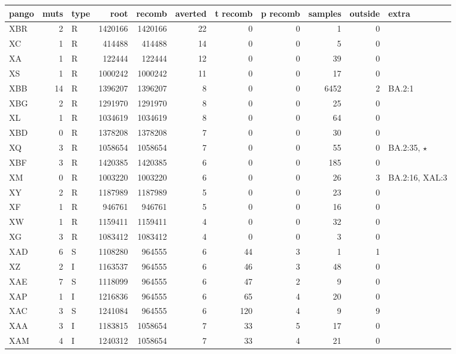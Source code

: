 \documentclass[a4paper]{article}
\begin{document}
\begin{footnotesize}
\begin{center}

\begin{tabular}{lrlrrrrrrrl}
\toprule
pango & muts & type & root & recomb & averted & t recomb & p recomb & samples &
outside & extra \\
\midrule
XBR & 2 & R & 1420166 & 1420166 & 22 & 0 & 0 & 1 & 0 & {} \\
XC & 1 & R & 414488 & 414488 & 14 & 0 & 0 & 5 & 0 & {} \\
XA & 1 & R & 122444 & 122444 & 12 & 0 & 0 & 39 & 0 & {} \\
XS & 1 & R & 1000242 & 1000242 & 11 & 0 & 0 & 17 & 0 & {} \\
XBB & 14 & R & 1396207 & 1396207 & 8 & 0 & 0 & 6452 & 2 & {BA.2:1} \\
XBG & 2 & R & 1291970 & 1291970 & 8 & 0 & 0 & 25 & 0 & {} \\
XL & 1 & R & 1034619 & 1034619 & 8 & 0 & 0 & 64 & 0 & {} \\
XBD & 0 & R & 1378208 & 1378208 & 7 & 0 & 0 & 30 & 0 & {} \\
XQ & 3 & R & 1058654 & 1058654 & 7 & 0 & 0 & 55 & 0 & {BA.2:35, $\star$} \\
XBF & 3 & R & 1420385 & 1420385 & 6 & 0 & 0 & 185 & 0 & {} \\
XM & 0 & R & 1003220 & 1003220 & 6 & 0 & 0 & 26 & 3 & {BA.2:16, XAL:3} \\
XY & 2 & R & 1187989 & 1187989 & 5 & 0 & 0 & 23 & 0 & {} \\
XF & 1 & R & 946761 & 946761 & 5 & 0 & 0 & 16 & 0 & {} \\
XW & 1 & R & 1159411 & 1159411 & 4 & 0 & 0 & 32 & 0 & {} \\
XG & 3 & R & 1083412 & 1083412 & 4 & 0 & 0 & 3 & 0 & {} \\
\midrule
XAD & 6 & S & 1108280 & 964555 & 6 & 44 & 3 & 1 & 1 & {} \\
XZ & 2 & I & 1163537 & 964555 & 6 & 46 & 3 & 48 & 0 & {} \\
XAE & 7 & S & 1118099 & 964555 & 6 & 47 & 2 & 9 & 0 & {} \\
XAP & 1 & I & 1216836 & 964555 & 6 & 65 & 4 & 20 & 0 & {} \\
XAC & 3 & S & 1241084 & 964555 & 6 & 120 & 4 & 9 & 9 & {} \\
\cmidrule{3-8}
XAA & 3 & I & 1183815 & 1058654 & 7 & 33 & 5 & 17 & 0 & {} \\
XAM & 4 & I & 1240312 & 1058654 & 7 & 33 & 4 & 21 & 0 & {} \\

\end{tabular}
\end{center}
\end{footnotesize}
\end{document}
